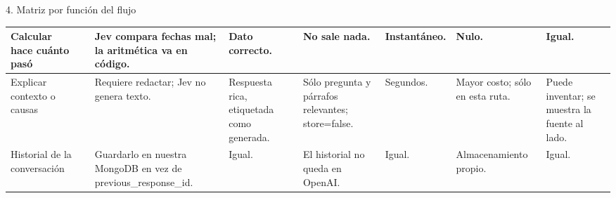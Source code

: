 \documentclass{article}
\newcommand{\etq}[3]{\tcbox[on line,colback=#2,colframe=#2,coltext=white,boxsep=1pt,left=4pt,right=4pt,top=1pt,bottom=1pt,arc=3pt]{#1}}
\newcommand{\LLM}{\etq{LLM}{llm}{}}
\newcommand{\CODE}{\etq{CODE}{code}{}}
\newcommand{\HS}{\etq{Supuesto}{sup}{}}
\begin{document}
\begin{panel}{4. Matriz por función del flujo}
\begin{tabularx}{\linewidth}{@{}>{\raggedright}p{75mm}>{\centering}p{25mm}>{\raggedright}X>{\raggedright}p{88mm}>{\raggedright}p{80mm}>{\raggedright}p{58mm}>{\raggedright}p{70mm}>{\raggedright\arraybackslash}p{88mm}@{}}
Calcular hace cuánto pasó & \CODE & Jev compara fechas mal; la aritmética va en código. & Dato correcto. & No sale nada. & Instantáneo. & Nulo. & Igual. \\\hline
Explicar contexto o causas & \LLM & Requiere redactar; Jev no genera texto. & Respuesta rica, etiquetada como generada. & Sólo pregunta y párrafos relevantes; store=false. & Segundos. \HS & Mayor costo; sólo en esta ruta. & Puede inventar; se muestra la fuente al lado. \\\hline
Historial de la conversación & \CODE & Guardarlo en nuestra MongoDB en vez de previous\_response\_id. & Igual. & El historial no queda en OpenAI. & Igual. & Almacenamiento propio. & Igual. \\
\end{tabularx}
\end{panel}

\vspace{10pt}
\end{document}
